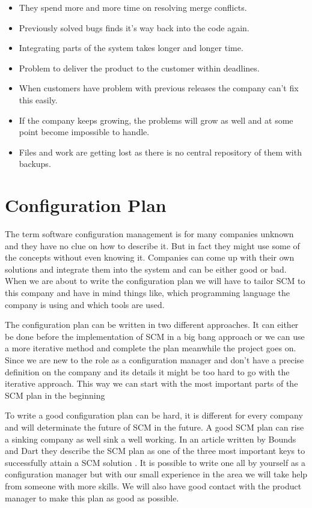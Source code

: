 \documentclass[a4paper,11pt]{article}
\begin{document}
\begin{itemize}
\item They spend more and more time on resolving merge conflicts.
\item Previously solved bugs finds it’s way back into the code again.
\item Integrating parts of the system takes longer and longer time.
\item Problem to deliver the product to the customer within deadlines.
\item When customers have problem with previous releases the company can't fix this easily.
\item If the company keeps growing, the problems will grow as well and at some point become impossible to handle.
\item Files and work are getting lost as there is no central repository of them with backups.
\end{itemize}



\section{Configuration Plan}


The term software configuration management is for many companies unknown and they have no clue on how to describe it.
But in fact they might use some of the concepts without even knowing it.
Companies can come up with their own solutions and integrate them into the system and can be either good or bad.
When we are about to write the configuration plan we will have to tailor SCM to this company and have in mind things like, which programming language the company is using and which tools are used.

The configuration plan can be written in two different approaches. \cite{SCMPLAN} It can either be done before the implementation of SCM in a big bang approach or we can use a more iterative method and complete the plan meanwhile the project goes on.
Since we are new to the role as a configuration manager and don’t have a precise definition on the company and its details it might be too hard to go with the iterative approach.
This way we can start with the most important parts of the SCM plan in the beginning

To write a good configuration plan can be hard, it is different for every company and will determinate the future of SCM in the future.
A good SCM plan can rise a sinking company as well sink a well working.
In an article written by Bounds and Dart they describe the SCM plan as one of the three most important keys to successfully attain a SCM solution \cite{BoundsDart}.
It is possible to write one all by yourself as a configuration manager but with our small experience in the area we will take help from someone with more skills.
We will also have good contact with the product manager to make this plan as good as possible.
\end{document}
